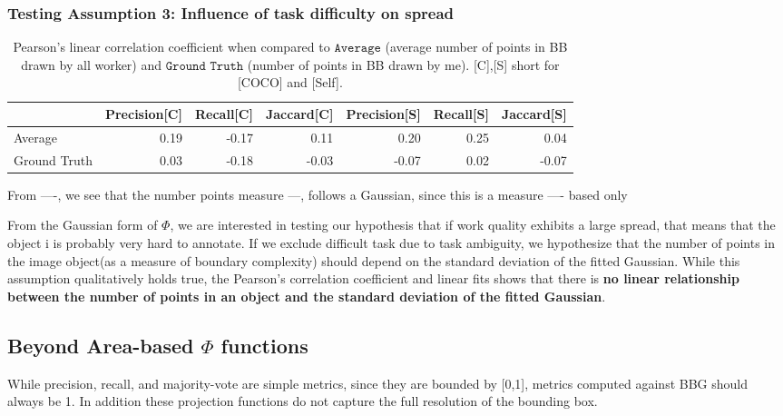 \documentclass[12pt]{article}
\begin{document}
\subsubsection{Testing Assumption 3: Influence of task difficulty on spread}
\begin{table}[ht]
\centering
\begin{tabular}{lrrrrrr}
\hline
                              &   Precision[C] &   Recall[C] &   Jaccard[C] &   Precision[S] &   Recall[S] &   Jaccard[S] \\
\hline
 Average             &   0.19 &  -0.17 &   0.11 &   0.20 &   0.25 &   0.04 \\
Ground Truth &   0.03 &  -0.18 &  -0.03 &  -0.07 &   0.02 &  -0.07 \\
\hline
\end{tabular}
\caption{Pearson's linear correlation coefficient when compared to $\texttt{Average}$ (average number of points in BB drawn by all worker) and  $\texttt{Ground Truth}$ (number of points in BB drawn by me). [C],[S] short for [COCO] and [Self].}
\end{table}
\par From ----, we see that the number points  measure ---, follows a Gaussian, since this is a measure ---- based only 
\par From the Gaussian form of $\Phi$, we are interested in testing our hypothesis that if work quality exhibits a large spread, that means that the object i is probably very hard to annotate. If we exclude difficult task due to task ambiguity, we hypothesize that the number of points in the image object(as a measure of boundary complexity) should depend on the standard deviation of the fitted Gaussian. While this assumption qualitatively holds true, the Pearson's correlation coefficient and linear fits shows that there is \textbf{no linear relationship between the number of points in an object and the standard deviation of the fitted Gaussian}.

\subsection{Beyond Area-based $\Phi$ functions}
\par While precision, recall, and majority-vote are simple metrics, since they are bounded by [0,1], metrics computed against BBG should always be 1. In addition these projection functions do not capture the full resolution of the bounding box.  
\end{document}
